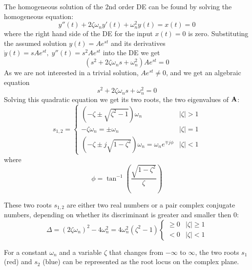 \documentclass{article}
\begin{document}
The homogeneous solution of the 2nd order DE can be found
by solving the homogeneous equation:
\begin{equation}
  y''(t)+2\zeta\omega_n y'(t)+\omega_n^2 y(t)=x(t)=0
\end{equation}
where the right hand side of the DE for the input $x(t)=0$ is 
zero. Substituting the assumed solution $y(t)=Ae^{st}$ and its 
derivatives $\dot{y}(t)=s Ae^{st},\;y''(t)=s^2 Ae^{st}$ into
the DE we get
\begin{equation}
  (s^2+2\zeta\omega_n s+\omega_n^2)Ae^{st}=0 
\end{equation}
As we are not interested in a trivial solution, $Ae^{st}\ne 0$, and
we get an algebraic equation
\begin{equation} 
  s^2+2\zeta\omega_n s+\omega_n^2=0 
\end{equation}
Solving this quadratic equation we get its two roots, the two 
eigenvalues of ${\bf A}$:
\begin{equation} 
  s_{1,2}=\left\{\begin{array}{ll}
  \left(-\zeta\pm\sqrt{\zeta^2-1}\right)\omega_n&|\zeta|> 1\\
  -\zeta\omega_n=\pm\omega_n & |\zeta|=1\\
  \left(-\zeta\pm j\sqrt{1-\zeta^2}\right)\omega_n=\omega_n e^{\mp j\phi} 
  &|\zeta|< 1\end{array}\right.
\end{equation}
where
\begin{equation}
  \phi=\tan^{-1}\left(\frac{\sqrt{1-\zeta^2}}{\zeta}\right) 
\end{equation}

These two roots $s_{1,2}$ are either two real numbers or a pair 
complex conjugate numbers, depending on whether its discriminant 
is greater and smaller then 0:
\begin{equation}
  \Delta=(2\zeta\omega_n)^2-4\omega_n^2=4\omega_n^2(\zeta^2-1)
  \left\{\begin{array}{ll}\ge 0 & |\zeta|\ge 1\\< 0 & |\zeta|< 1\end{array}\right.
\end{equation}


For a constant $\omega_n$ and a variable $\zeta$ that changes 
from $-\infty$ to $\infty$, the two roots $s_1$ (red) and $s_2$ 
(blue) can be represented as the root locus on the complex plane.
\end{document}
